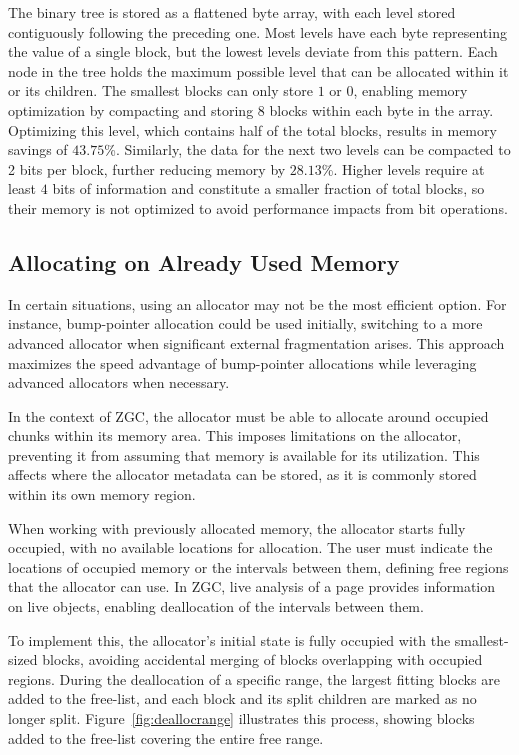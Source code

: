 \newpage
The binary tree is stored as a flattened byte array, with each level stored contiguously following the preceding one. Most levels have each byte representing the value of a single block, but the lowest levels deviate from this pattern. Each node in the tree holds the maximum possible level that can be allocated within it or its children. The smallest blocks can only store $1$ or $0$, enabling memory optimization by compacting and storing 8 blocks within each byte in the array. Optimizing this level, which contains half of the total blocks, results in memory savings of $43.75$\%. Similarly, the data for the next two levels can be compacted to 2 bits per block, further reducing memory by $28.13$\%. Higher levels require at least $4$ bits of information and constitute a smaller fraction of total blocks, so their memory is not optimized to avoid performance impacts from bit operations.

\subsection{Allocating on Already Used Memory} \label{sec:freerangeexpl}
In certain situations, using an allocator may not be the most efficient option. For instance, bump-pointer allocation could be used initially, switching to a more advanced allocator when significant external fragmentation arises. This approach maximizes the speed advantage of bump-pointer allocations while leveraging advanced allocators when necessary.

In the context of ZGC, the allocator must be able to allocate around occupied chunks within its memory area. This imposes limitations on the allocator, preventing it from assuming that memory is available for its utilization. This affects where the allocator metadata can be stored, as it is commonly stored within its own memory region.

When working with previously allocated memory, the allocator starts fully occupied, with no available locations for allocation. The user must indicate the locations of occupied memory or the intervals between them, defining free regions that the allocator can use. In ZGC, live analysis of a page provides information on live objects, enabling deallocation of the intervals between them.

To implement this, the allocator's initial state is fully occupied with the smallest-sized blocks, avoiding accidental merging of blocks overlapping with occupied regions. During the deallocation of a specific range, the largest fitting blocks are added to the free-list, and each block and its split children are marked as no longer split. Figure~\ref{fig:deallocrange} illustrates this process, showing blocks added to the free-list covering the entire free range.

